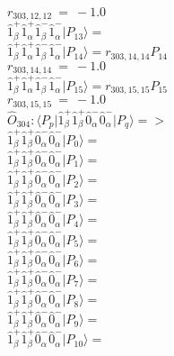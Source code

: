 \documentclass[14pt]{article}
\begin{document}
    ${r}_{303,12,12}\ =\ -1.0 $ \\ 
    $ \hat{1}_{\beta}^{+}\hat{1}_{\alpha}^{+}\hat{1}_{\beta}^{-}\hat{1}_{\alpha}^{-} \vert{P_{13}}\rangle =  $ \\ 
    $ \hat{1}_{\beta}^{+}\hat{1}_{\alpha}^{+}\hat{1}_{\beta}^{-}\hat{1}_{\alpha}^{-} \vert{P_{14}}\rangle = {r}_{303,14,14}P_{14} $ \\ 
    ${r}_{303,14,14}\ =\ -1.0 $ \\ 
    $ \hat{1}_{\beta}^{+}\hat{1}_{\alpha}^{+}\hat{1}_{\beta}^{-}\hat{1}_{\alpha}^{-} \vert{P_{15}}\rangle = {r}_{303,15,15}P_{15} $ \\ 
    ${r}_{303,15,15}\ =\ -1.0 $ \\ 
    
    $\hat{O}_{304}:  \langle{P_p}\vert \hat{1}_{\beta}^{+}\hat{1}_{\beta}^{+}\hat{0}_{\alpha}^{-}\hat{0}_{\alpha}^{-} \vert{P_q}\rangle => $ \\ 
    $ \hat{1}_{\beta}^{+}\hat{1}_{\beta}^{+}\hat{0}_{\alpha}^{-}\hat{0}_{\alpha}^{-} \vert{P_{0}}\rangle =  $ \\ 
    $ \hat{1}_{\beta}^{+}\hat{1}_{\beta}^{+}\hat{0}_{\alpha}^{-}\hat{0}_{\alpha}^{-} \vert{P_{1}}\rangle =  $ \\ 
    $ \hat{1}_{\beta}^{+}\hat{1}_{\beta}^{+}\hat{0}_{\alpha}^{-}\hat{0}_{\alpha}^{-} \vert{P_{2}}\rangle =  $ \\ 
    $ \hat{1}_{\beta}^{+}\hat{1}_{\beta}^{+}\hat{0}_{\alpha}^{-}\hat{0}_{\alpha}^{-} \vert{P_{3}}\rangle =  $ \\ 
    $ \hat{1}_{\beta}^{+}\hat{1}_{\beta}^{+}\hat{0}_{\alpha}^{-}\hat{0}_{\alpha}^{-} \vert{P_{4}}\rangle =  $ \\ 
    $ \hat{1}_{\beta}^{+}\hat{1}_{\beta}^{+}\hat{0}_{\alpha}^{-}\hat{0}_{\alpha}^{-} \vert{P_{5}}\rangle =  $ \\ 
    $ \hat{1}_{\beta}^{+}\hat{1}_{\beta}^{+}\hat{0}_{\alpha}^{-}\hat{0}_{\alpha}^{-} \vert{P_{6}}\rangle =  $ \\ 
    $ \hat{1}_{\beta}^{+}\hat{1}_{\beta}^{+}\hat{0}_{\alpha}^{-}\hat{0}_{\alpha}^{-} \vert{P_{7}}\rangle =  $ \\ 
    $ \hat{1}_{\beta}^{+}\hat{1}_{\beta}^{+}\hat{0}_{\alpha}^{-}\hat{0}_{\alpha}^{-} \vert{P_{8}}\rangle =  $ \\ 
    $ \hat{1}_{\beta}^{+}\hat{1}_{\beta}^{+}\hat{0}_{\alpha}^{-}\hat{0}_{\alpha}^{-} \vert{P_{9}}\rangle =  $ \\ 
    $ \hat{1}_{\beta}^{+}\hat{1}_{\beta}^{+}\hat{0}_{\alpha}^{-}\hat{0}_{\alpha}^{-} \vert{P_{10}}\rangle =  $ \\ 
\end{document}
